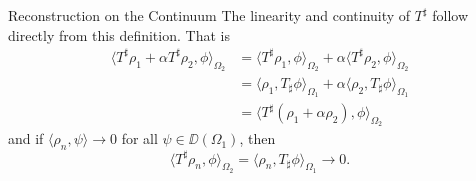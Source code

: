 \begin{chapter}{Reconstruction on the Continuum}
  The linearity and continuity of $T^\sharp$ follow directly from this definition.
  That is 
  \begin{align}
    \langle T^\sharp \rho_1 + \alpha T^\sharp \rho_2,\phi\rangle_{\Omega_2} 
    &= \langle T^\sharp\rho_1,\phi\rangle_{\Omega_2} + \alpha\langle T^\sharp\rho_2 ,\phi \rangle_{\Omega_2} \nonumber\\ 
    &= \langle \rho_1,T_\sharp\phi\rangle_{\Omega_1} + \alpha\langle \rho_2 ,T_\sharp\phi \rangle_{\Omega_1} \nonumber\\
    &= \langle T^\sharp(\rho_1+\alpha \rho_2),\phi\rangle_{\Omega_2} \label{eq:linearity} 
  \end{align} 
  and if $\langle \rho_n, \psi\rangle \to 0$ for all $\psi \in \DD(\Omega_1)$, then 
  \begin{equation}
    \langle T^\sharp \rho_n,\phi\rangle_{\Omega_2} = \langle \rho_n,T_\sharp\phi\rangle_{\Omega_1} \to 0.
  \end{equation}


\end{chapter}
